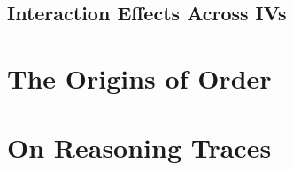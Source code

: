 \subsection{Interaction Effects Across IVs}

\section{The Origins of Order}
%


\section{On Reasoning Traces}
%
%

